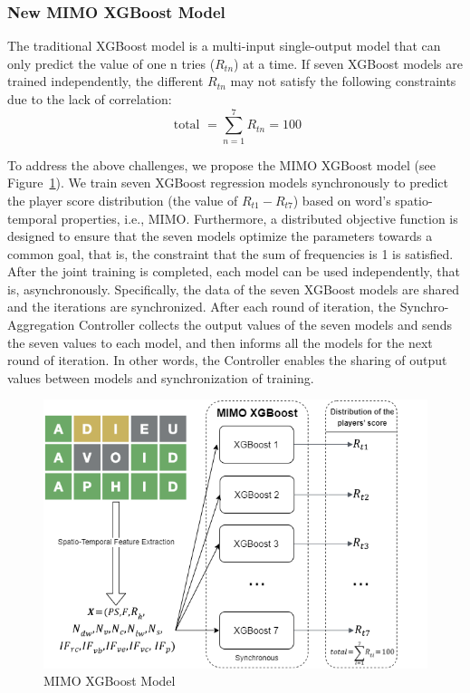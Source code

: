 \documentclass[a4paper]{jpconf}
\begin{document}
\subsubsection{New MIMO XGBoost Model}
The traditional XGBoost model \cite{chen2016xgboost} is a multi-input single-output model that can only predict the value of one n tries ($R_{tn}$) at a time. If  seven XGBoost models are trained independently, the different $R_{tn}$ may not satisfy the following constraints due to the lack of correlation:
\begin{equation}
\text { total }=\sum_{n=1}^{7} R_{t n}=100
\end{equation}

To address the above challenges, we propose the MIMO XGBoost model (see Figure~\ref{fig:model}). We train seven XGBoost regression models synchronously to predict the player score distribution (the value of $R_{t1}-R_{t7}$) based on word's spatio-temporal properties, i.e., MIMO. Furthermore, a distributed objective function is designed to ensure that the seven models optimize the parameters towards a common goal, that is, the constraint that the sum of frequencies is 1 is satisfied. After the joint training is completed, each model can be used independently, that is, asynchronously. Specifically, the data of the seven XGBoost models are shared and the iterations are synchronized. After each round of iteration, the Synchro-Aggregation Controller collects the output values of the seven models and sends the seven values to each model, and then informs all the models for the next round of iteration. In other words, the Controller enables the sharing of output values between models and synchronization of training.

\begin{figure}[htbp]
    \centering
    \includegraphics[width=.7\textwidth]{img/model.png}
    \caption{MIMO XGBoost Model}\label{fig:model}
\end{figure}
\end{document}

